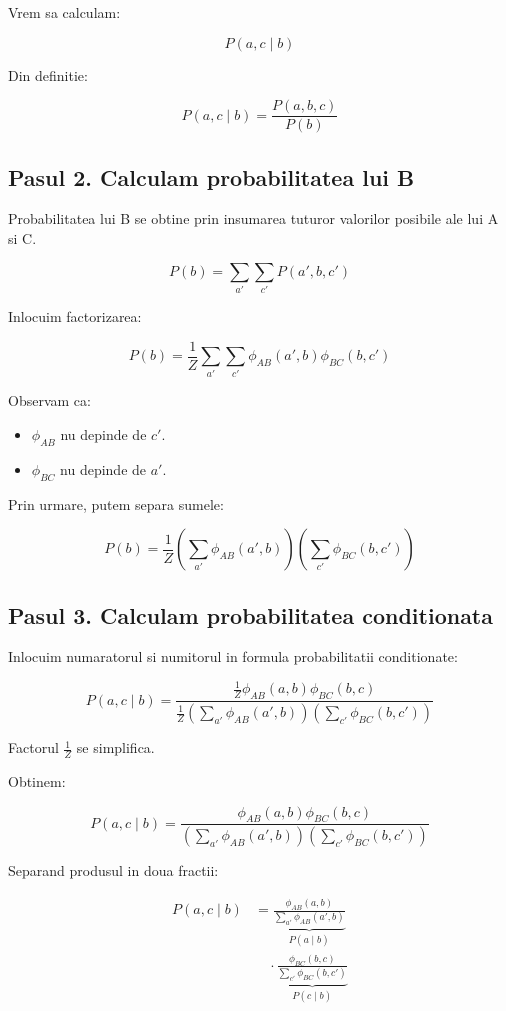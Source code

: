 \documentclass[12pt,a4paper]{article}
\begin{document}
Vrem sa calculam:

\[
P(a,c\mid b)
\]

Din definitie:

\[
\boxed{
P(a,c\mid b)=\frac{P(a,b,c)}{P(b)}
}
\]

\subsection*{Pasul 2. Calculam probabilitatea lui B}

Probabilitatea lui B se obtine prin insumarea tuturor valorilor posibile ale lui A si C.

\[
P(b)=\sum_{a'}\sum_{c'}P(a',b,c')
\]

Inlocuim factorizarea:

\[
P(b)=
\frac{1}{Z}
\sum_{a'}\sum_{c'}
\phi_{AB}(a',b)\phi_{BC}(b,c')
\]

Observam ca:

\begin{itemize}
    \item $\phi_{AB}$ nu depinde de $c'$.
    \item $\phi_{BC}$ nu depinde de $a'$.
\end{itemize}

Prin urmare, putem separa sumele:

\[
\boxed{
P(b)=\frac{1}{Z}
\left(
\sum_{a'}\phi_{AB}(a',b)
\right)
\left(
\sum_{c'}\phi_{BC}(b,c')
\right)
}
\]

\subsection*{Pasul 3. Calculam probabilitatea conditionata}

Inlocuim numaratorul si numitorul in formula probabilitatii conditionate:

\[
P(a,c\mid b)=
\frac{
\frac{1}{Z}\phi_{AB}(a,b)\phi_{BC}(b,c)
}{
\frac{1}{Z}
\left(\sum_{a'}\phi_{AB}(a',b)\right)
\left(\sum_{c'}\phi_{BC}(b,c')\right)
}
\]

Factorul $\frac{1}{Z}$ se simplifica.

Obtinem:

\[
P(a,c\mid b)=
\frac{
\phi_{AB}(a,b)\phi_{BC}(b,c)
}{
\left(\sum_{a'}\phi_{AB}(a',b)\right)
\left(\sum_{c'}\phi_{BC}(b,c')\right)
}
\]

Separand produsul in doua fractii:

\[
\begin{aligned}
P(a,c\mid b)
&=
\underbrace{
\frac{\phi_{AB}(a,b)}
{\sum_{a'}\phi_{AB}(a',b)}
}_{P(a\mid b)}
\\[8pt]
&\quad\cdot
\underbrace{
\frac{\phi_{BC}(b,c)}
{\sum_{c'}\phi_{BC}(b,c')}
}_{P(c\mid b)}
\end{aligned}
\]
\end{document}
